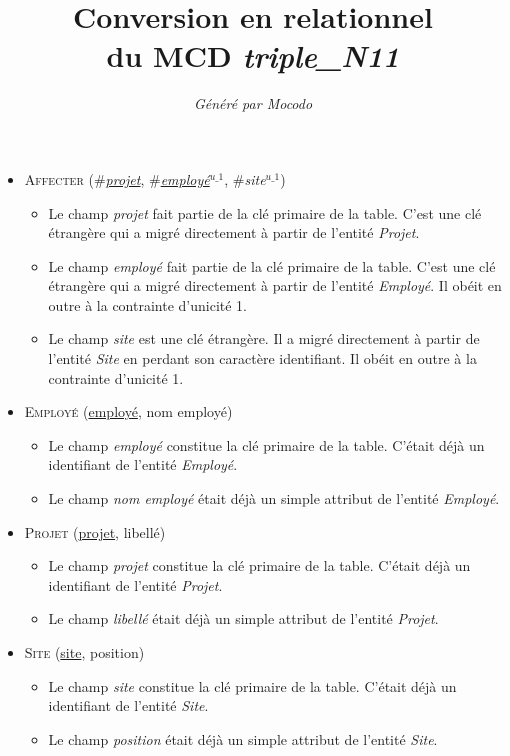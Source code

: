 \documentclass[a4paper]{article}
\title{Conversion en relationnel\\du MCD \emph{triple\_N11}}
\author{\emph{Généré par Mocodo}}
\newcommand{\relat}[1]{\textsc{#1}}
\newcommand{\attr}[1]{#1}
\newcommand{\prim}[1]{\uline{#1}}
\newcommand{\foreign}[1]{\#\textsl{#1}}
\begin{document}
\maketitle

\begin{itemize}
  \item \relat{Affecter} (\foreign{\prim{projet}}, \foreign{\prim{employé}}$^{u\_1}$, \foreign{site}$^{u\_1}$)
  \begin{itemize}
    \item Le champ \emph{projet} fait partie de la clé primaire de la table. C'est une clé étrangère qui a migré directement à partir de l'entité \emph{Projet}.
    \item Le champ \emph{employé} fait partie de la clé primaire de la table. C'est une clé étrangère qui a migré directement à partir de l'entité \emph{Employé}. Il obéit en outre à la contrainte d'unicité 1.
    \item Le champ \emph{site} est une clé étrangère. Il a migré directement à partir de l'entité \emph{Site} en perdant son caractère identifiant. Il obéit en outre à la contrainte d'unicité 1.
  \end{itemize}

  \item \relat{Employé} (\prim{employé}, \attr{nom employé})
  \begin{itemize}
    \item Le champ \emph{employé} constitue la clé primaire de la table. C'était déjà un identifiant de l'entité \emph{Employé}.
    \item Le champ \emph{nom employé} était déjà un simple attribut de l'entité \emph{Employé}.
  \end{itemize}

  \item \relat{Projet} (\prim{projet}, \attr{libellé})
  \begin{itemize}
    \item Le champ \emph{projet} constitue la clé primaire de la table. C'était déjà un identifiant de l'entité \emph{Projet}.
    \item Le champ \emph{libellé} était déjà un simple attribut de l'entité \emph{Projet}.
  \end{itemize}

  \item \relat{Site} (\prim{site}, \attr{position})
  \begin{itemize}
    \item Le champ \emph{site} constitue la clé primaire de la table. C'était déjà un identifiant de l'entité \emph{Site}.
    \item Le champ \emph{position} était déjà un simple attribut de l'entité \emph{Site}.
  \end{itemize}

\end{itemize}
\end{document}
